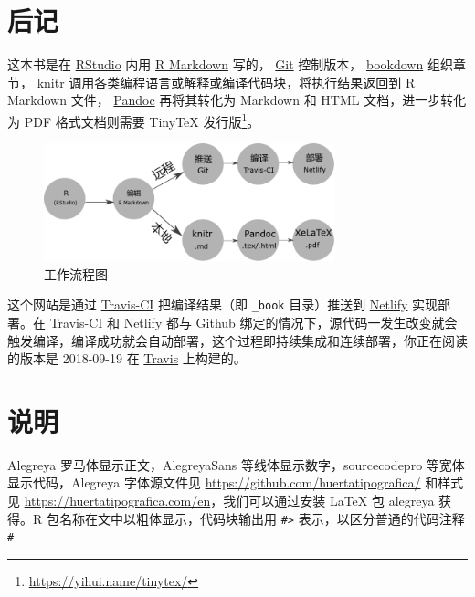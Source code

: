 \documentclass[a4paper,oneside,UTF8]{book}
\begin{document}
\hypertarget{colophon}{%
\section*{后记}\label{colophon}}

这本书是在 \href{https://www.rstudio.com/products/rstudio/download/}{RStudio} 内用 \href{https://rmarkdown.rstudio.com/}{R Markdown} \citep{xie2018} 写的， \href{https://git-scm.com/}{Git} 控制版本， \href{https://bookdown.org/yihui/bookdown/}{bookdown}  \citep{xie2016} 组织章节， \href{https://yihui.name/knitr/}{knitr}  \citep{xie2015} 调用各类编程语言或解释或编译代码块，将执行结果返回到 R Markdown 文件， \href{http://pandoc.org}{Pandoc}  再将其转化为 Markdown 和 HTML 文档，进一步转化为 PDF 格式文档则需要 TinyTeX  发行版\footnote{\url{https://yihui.name/tinytex/}}。

\begin{figure}
\centering
\includegraphics[width=0.75\textwidth,height=\textheight]{images/workflow.png}
\caption[\label{fig:workflow} 工作流程图]{\label{fig:workflow} 工作流程图\footnotemark{}}
\end{figure}

这个网站是通过 \href{https://travis-ci.com/}{Travis-CI} 把编译结果（即 \texttt{\_book} 目录）推送到 \href{https://www.netlify.com/}{Netlify} 实现部署。在 Travis-CI 和 Netlify 都与 Github 绑定的情况下，源代码一发生改变就会触发编译，编译成功就会自动部署，这个过程即持续集成和连续部署，你正在阅读的版本是 2018-09-19 在 \href{https://travis-ci.com/XiangyunHuang/ISCGwR}{Travis} 上构建的。

\hypertarget{conventions}{%
\section*{说明}\label{conventions}}

Alegreya 罗马体显示正文，AlegreyaSans 等线体显示数字，sourcecodepro 等宽体显示代码，Alegreya 字体源文件见 \url{https://github.com/huertatipografica/} 和样式见 \url{https://huertatipografica.com/en}，我们可以通过安装 LaTeX 包 alegreya 获得。R 包名称在文中以粗体显示，代码块输出用 \texttt{\#\textgreater{}} 表示，以区分普通的代码注释 \texttt{\#}
\end{document}
